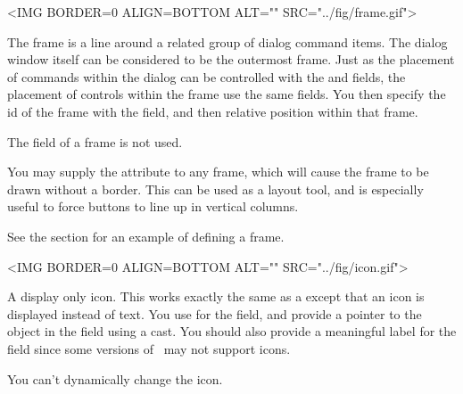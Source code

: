 
\small
\begin{rawhtml}
<IMG BORDER=0 ALIGN=BOTTOM ALT="" SRC="../fig/frame.gif">
\end{rawhtml}
\begin{latexonly}

\end{latexonly}
\normalfont\normalsize
\vspace{.1in}

The frame is a line around a related group of dialog command
items. The dialog window itself can be considered to be the
outermost frame. Just as the placement of commands within the
dialog can be controlled with the  and 
fields, the placement of controls within the frame use the same
fields. You then specify the id of the frame with the 
field, and then relative position within that frame.

The  field of a frame is not used.

You may supply the  attribute to any frame,
which will cause the frame to be drawn without a border. This can
be used as a layout tool, and is especially useful to force
buttons to line up in vertical columns.

See the section  for an example of defining a
frame.


\small
\begin{rawhtml}
<IMG BORDER=0 ALIGN=BOTTOM ALT="" SRC="../fig/icon.gif">
\end{rawhtml}
\begin{latexonly}

\end{latexonly}
\normalfont\normalsize
\vspace{.1in}

A display only icon. This works exactly the same as a 
except that an icon is displayed instead of text. You use 
for the  field, and provide a pointer to the
 object in the  field using a
 cast. You should also provide a meaningful label
for the  field since some versions of \V\ may not
support icons.

You can't dynamically change the icon. 



